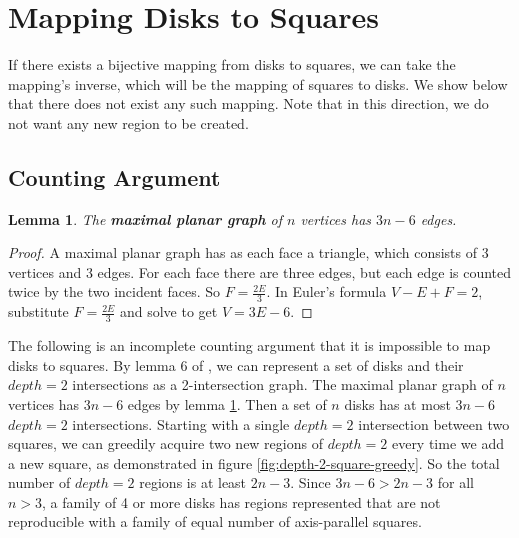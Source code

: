 \documentclass{NSF}
\newtheorem{lemma}[theorem]{Lemma}
\begin{document}
\section{Mapping Disks to Squares}
If there exists a bijective mapping from disks to squares, we can take the mapping's inverse, which will be the mapping of squares to disks. We show below that there does not exist any such mapping. Note that in this direction, we do not want any new region to be created. 

\subsection{Counting Argument}

\begin{lemma}
\label{lem:maximal-planar}
The \textbf{maximal planar graph} of $n$ vertices has $3n-6$ edges.
\end{lemma}
\begin{proof}
A maximal planar graph has as each face a triangle, which consists of 3 vertices and 3 edges. For each face there are three edges, but each edge is counted twice by the two incident faces. So $F=\frac{2E}{3}$. In Euler's formula $V-E+F=2$, substitute $F=\frac{2E}{3}$ and solve to get $V=3E-6$. 
\end{proof}

The following is an incomplete counting argument that it is impossible to map disks to squares.
 By lemma 6 of \cite{Pyrga:2008:NEP:1377676.1377708}, we can represent a set of disks and their $depth=2$ intersections as a 2-intersection graph. The maximal planar graph of $n$ vertices has $3n-6$ edges by lemma \ref{lem:maximal-planar}. Then a set of $n$ disks has at most $3n-6$ $depth=2$ intersections. %
Starting with a single $depth=2$ intersection between two squares, we can greedily acquire two new regions of $depth=2$ every time we add a new square, as demonstrated in figure \ref{fig:depth-2-square-greedy}. So the total number of $depth=2$ regions is at least $2n-3$.
Since $3n-6 > 2n-3$ for all $n > 3$, a family of 4 or more disks has regions represented that are not reproducible with a family of equal number of axis-parallel squares.
\end{document}
